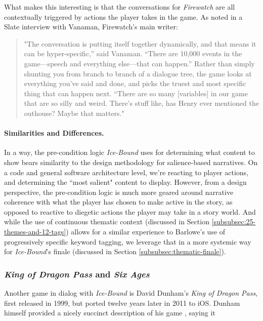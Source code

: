 What makes this interesting is that the conversations for \textit{Firewatch} are all contextually triggered by actions the player takes in the game. As noted in a Slate interview with Vanaman, Firewatch's main writer:

\begin{quote}
"The conversation is putting itself together dynamically, and that means it can be hyper-specific,” said Vanaman. “There are 10,000 events in the game—speech and everything else—that can happen.” Rather than simply shunting you from branch to branch of a dialogue tree, the game looks at everything you’ve said and done, and picks the truest and most specific thing that can happen next. “There are so many [variables] in our game that are so silly and weird. There’s stuff like, has Henry ever mentioned the outhouse? Maybe that matters." \cite{hudson_2016}    
\end{quote}

\paragraph{Similarities and Differences.}\label{par:salience-similarities-and-differences}
In a way, the pre-condition logic \textit{Ice-Bound} uses for determining what content to show bears similarity to the design methodology for salience-based narratives. On a code and general software architecture level, we're reacting to player actions, and determining the ``most salient" content to display. However, from a design perspective, the pre-condition logic is much more geared around narrative coherence with what the player has chosen to make active in the story, as opposed to reactive to diegetic actions the player may take in a story world. And while the use of continuous thematic context (discussed in Section \ref{subsubsec:25-themes-and-12-tags}) allows for a similar experience to Barlowe's use of progressively specific keyword tagging, we leverage that in a more systemic way for \textit{Ice-Bound}'s finale (discussed in Section \ref{subsubsec:thematic-finale}).
\subsubsection{\textit{King of Dragon Pass} and \textit{Six Ages}}\label{subsubsec:king-of-dragon-pass}

Another game in dialog with \textit{Ice-Bound} is David Dunham's \textit{King of Dragon Pass}, first released in 1999, but ported twelve years later in 2011 to iOS. Dunham himself provided a nicely succinct description of his game \cite{dunham_2011}, saying it

